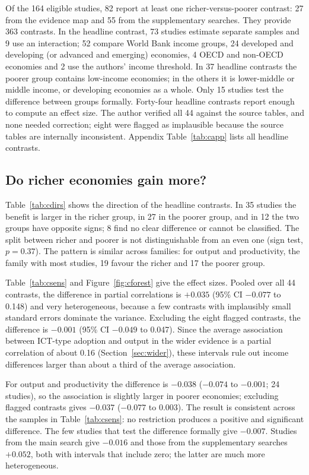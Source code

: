\documentclass[11pt,a4paper]{article}
\begin{document}
Of the 164 eligible studies, 82 report at least one richer-versus-poorer contrast: 27 from the evidence map and 55 from the supplementary searches. They provide 363 contrasts. In the headline contrast, 73 studies estimate separate samples and 9 use an interaction; 52 compare World Bank income groups, 24 developed and developing (or advanced and emerging) economies, 4 OECD and non-OECD economies and 2 use the authors' income threshold. In 37 headline contrasts the poorer group contains low-income economies; in the others it is lower-middle or middle income, or developing economies as a whole. Only 15 studies test the difference between groups formally. Forty-four headline contrasts report enough to compute an effect size. The author verified all 44 against the source tables, and none needed correction; eight were flagged as implausible because the source tables are internally inconsistent. Appendix Table~\ref{tab:capp} lists all headline contrasts.

\subsection{Do richer economies gain more?}
Table~\ref{tab:cdirs} shows the direction of the headline contrasts. In 35 studies the benefit is larger in the richer group, in 27 in the poorer group, and in 12 the two groups have opposite signs; 8 find no clear difference or cannot be classified. The split between richer and poorer is not distinguishable from an even one (sign test, $p = 0.37$). The pattern is similar across families: for output and productivity, the family with most studies, 19 favour the richer and 17 the poorer group.



Table~\ref{tab:csens} and Figure~\ref{fig:cforest} give the effect sizes. Pooled over all 44 contrasts, the difference in partial correlations is $+0.035$ (95\% CI $-0.077$ to 0.148) and very heterogeneous, because a few contrasts with implausibly small standard errors dominate the variance. Excluding the eight flagged contrasts, the difference is $-0.001$ (95\% CI $-0.049$ to 0.047). Since the average association between ICT-type adoption and output in the wider evidence is a partial correlation of about 0.16 (Section~\ref{sec:wider}), these intervals rule out income differences larger than about a third of the average association.

For output and productivity the difference is $-0.038$ ($-0.074$ to $-0.001$; 24 studies), so the association is slightly larger in poorer economies; excluding flagged contrasts gives $-0.037$ ($-0.077$ to 0.003). The result is consistent across the samples in Table~\ref{tab:csens}: no restriction produces a positive and significant difference. The few studies that test the difference formally give $-0.007$. Studies from the main search give $-0.016$ and those from the supplementary searches $+0.052$, both with intervals that include zero; the latter are much more heterogeneous.
\end{document}
